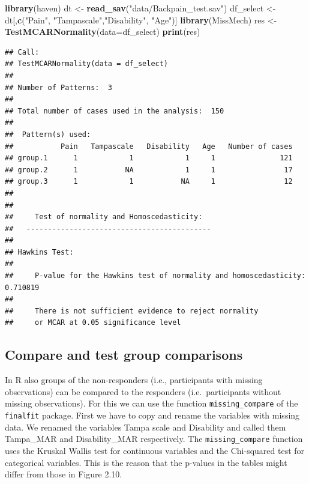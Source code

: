 \documentclass[
]{book}
\newenvironment{Shaded}{\begin{snugshade}}{\end{snugshade}}
\newcommand{\DataTypeTok}[1]{\textcolor[rgb]{0.13,0.29,0.53}{#1}}
\newcommand{\KeywordTok}[1]{\textcolor[rgb]{0.13,0.29,0.53}{\textbf{#1}}}
\newcommand{\NormalTok}[1]{#1}
\newcommand{\StringTok}[1]{\textcolor[rgb]{0.31,0.60,0.02}{#1}}
\begin{document}
\begin{Shaded}
\begin{Highlighting}[]
\KeywordTok{library}\NormalTok{(haven)}
\NormalTok{dt <-}\StringTok{ }\KeywordTok{read_sav}\NormalTok{(}\StringTok{"data/Backpain_test.sav"}\NormalTok{)}
\NormalTok{df_select <-}\StringTok{ }\NormalTok{dt[,}\KeywordTok{c}\NormalTok{(}\StringTok{"Pain"}\NormalTok{, }\StringTok{"Tampascale"}\NormalTok{,}\StringTok{"Disability"}\NormalTok{, }\StringTok{"Age"}\NormalTok{)]}
\KeywordTok{library}\NormalTok{(MissMech)}
\NormalTok{res <-}\StringTok{ }\KeywordTok{TestMCARNormality}\NormalTok{(}\DataTypeTok{data=}\NormalTok{df_select)}
\KeywordTok{print}\NormalTok{(res)}
\end{Highlighting}
\end{Shaded}

\begin{verbatim}
## Call:
## TestMCARNormality(data = df_select)
## 
## Number of Patterns:  3 
## 
## Total number of cases used in the analysis:  150 
## 
##  Pattern(s) used:
##           Pain   Tampascale   Disability   Age   Number of cases
## group.1      1            1            1     1               121
## group.2      1           NA            1     1                17
## group.3      1            1           NA     1                12
## 
## 
##     Test of normality and Homoscedasticity:
##   -------------------------------------------
## 
## Hawkins Test:
## 
##     P-value for the Hawkins test of normality and homoscedasticity:  0.710819 
## 
##     There is not sufficient evidence to reject normality
##     or MCAR at 0.05 significance level
\end{verbatim}

\hypertarget{compare-and-test-group-comparisons-1}{%
\subsection{Compare and test group comparisons}\label{compare-and-test-group-comparisons-1}}

In R also groups of the non-responders (i.e., participants with missing observations) can be compared to the responders (i.e.~participants without missing observations). For this we can use the function \texttt{missing\_compare} of the \texttt{finalfit} package. First we have to copy and rename the variables with missing data. We renamed the variables Tampa scale and Disability and called them Tampa\_MAR and Disability\_MAR respectively. The \texttt{missing\_compare} function uses the Kruskal Wallis test for continuous variables and the Chi-squared test for categorical variables. This is the reason that the p-values in the tables might differ from those in Figure 2.10.
\end{document}

